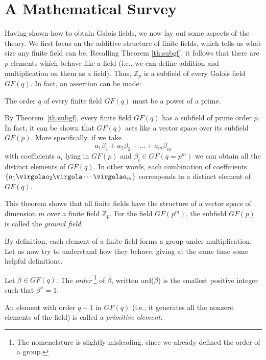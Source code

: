 \section{A Mathematical Survey} \label{sec:MathSurvey}
Having shown how to obtain Galois fields, we now lay out some aspects of the theory. We first focus on the additive structure of finite fields, which tells us what size any finite field can be. Recalling Theorem \ref{th:subgf}, it follows that there are $p$ elements which behave like a field (i.e., we can define addition and multiplication on them as a field). Thus, \( \mathbb Z_p\) is a subfield of every Galois field $GF(q)$. In fact, an assertion can be made:

\begin{Theorem}
The order $q$ of every finite field $GF(q)$ must be a power of a prime.
\end{Theorem}

By Theorem~\ref{th:subgf}, every finite field $GF(q)$ has a subfield of prime order $p$. In fact, it can be shown that $GF(q)$ acts like a vector space over its subfield $GF(p)$. More specifically, if we take
\begin{equation}
a_1\beta_1 + a_2\beta_2 + \ldots + a_m\beta_m
\end{equation}
with coefficients \(a_i\) lying in $GF(p)$ and $\beta_i \in GF(q=p^m)$ we can obtain all the distinct elements of $GF(q)$. In other words, each combination of coefficients \( \{a_1 \virgola a_2 \virgola \cdots \virgola a_m\}\) corresponds to a distinct element of $GF(q)$.

This theorem shows that all finite fields have the structure of a vector space of dimension $m$ over a finite field \( \mathbb Z_p\). For the field $GF(p^m)$, the subfield $GF(p)$ is called the \emph{ground field}.

By definition, each element of a finite field forms a group under multiplication. Let us now try to understand how they behave, giving at the same time some helpful definitions.

\begin{Def}
Let $\beta \in GF(q)$. The \emph{order}  \footnote{The nomenclature is slightly misleading, since we already defined the order of a group.}
 of $\beta$, written ord($\beta$) is the smallest positive integer such that \(\beta^n=1\).
\end{Def}


\begin{Def}
An element with order $q-1$ in $GF(q)$ (i.e., it generates all the nonzero elements of the field) is called a \emph{primitive element}.
\end{Def}

